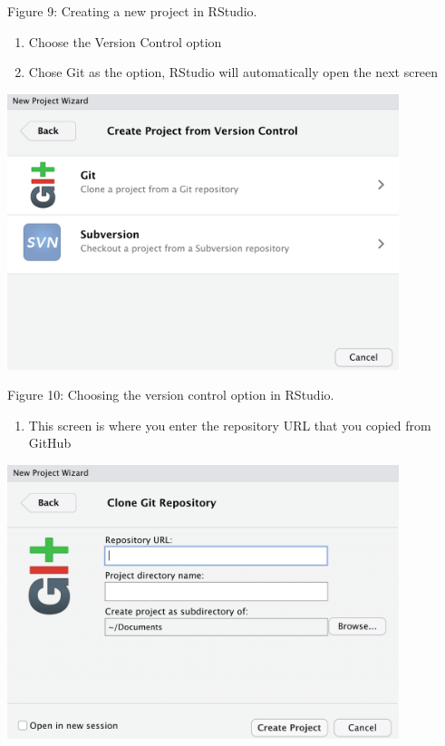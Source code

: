 \documentclass[
]{article}
\providecommand{\tightlist}{%
  \setlength{\itemsep}{0pt}\setlength{\parskip}{0pt}}
\begin{document}
Figure 9: Creating a new project in RStudio.

\begin{enumerate}
\def\labelenumi{\arabic{enumi}.}
\setcounter{enumi}{3}
\tightlist
\item
  Choose the Version Control option
\item
  Chose Git as the option, RStudio will automatically open the next
  screen
\end{enumerate}

\includegraphics[width=4.5in,height=\textheight]{images/new-project-02.png}

Figure 10: Choosing the version control option in RStudio.

\begin{enumerate}
\def\labelenumi{\arabic{enumi}.}
\setcounter{enumi}{5}
\tightlist
\item
  This screen is where you enter the repository URL that you copied from
  GitHub
\end{enumerate}

\includegraphics[width=4.5in,height=\textheight]{images/new-project-03.png}
\end{document}
